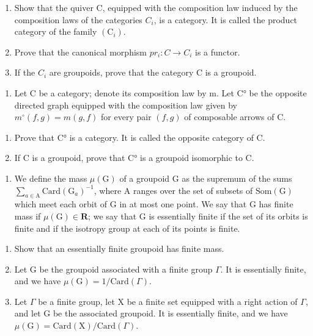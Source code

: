 \begin{enumerate}
\def\labelenumi{\alph{enumi})}
\item
  Show that the quiver C, equipped with the composition law induced by the composition laws of the categories \(C_{i}\), is a category. It is called the product category of the family \((\mathrm{C}_{i})\).
\item
  Prove that the canonical morphism \(pr_{i}: C \rightarrow C_{i}\) is a functor.
\item
  If the \(C_{i}\) are groupoids, prove that the category C is a groupoid.
\end{enumerate}

\begin{enumerate}
\def\labelenumi{\arabic{enumi})}
\setcounter{enumi}{2}
\tightlist
\item
  Let C be a category; denote its composition law by m. Let C° be the opposite directed graph equipped with the composition law given by \(m^{\circ}(f,g)=m(g,f)\) for every pair \((f,g)\) of composable arrows of C.
\end{enumerate}

\begin{enumerate}
\def\labelenumi{\alph{enumi})}
\item
  Prove that C° is a category. It is called the opposite category of C.
\item
  If C is a groupoid, prove that C° is a groupoid isomorphic to C.
\end{enumerate}

\begin{enumerate}
\def\labelenumi{\arabic{enumi})}
\setcounter{enumi}{3}
\tightlist
\item
  We define the mass \(\mu(\mathrm{G})\) of a groupoid G as the supremum of the sums \(\sum_{a\in\mathrm{A}}\mathrm{Card}(\mathrm{G}_{a})^{-1}\), where A ranges over the set of subsets of \(\mathrm{Som}(\mathrm{G})\) which meet each orbit of G in at most one point. We say that G has finite mass if \(\mu(\mathrm{G})\in\mathbf{R}\); we say that G is essentially finite if the set of its orbits is finite and if the isotropy group at each of its points is finite.
\end{enumerate}

\begin{enumerate}
\def\labelenumi{\alph{enumi})}
\item
  Show that an essentially finite groupoid has finite mass.
\item
  Let G be the groupoid associated with a finite group \(\Gamma\). It is essentially finite, and we have \(\mu(\mathrm{G}) = 1/\mathrm{Card}(\Gamma)\).
\item
  Let \(\Gamma\) be a finite group, let X be a finite set equipped with a right action of \(\Gamma\), and let G be the associated groupoid. It is essentially finite, and we have \(\mu(\mathrm{G}) = \mathrm{Card}(\mathrm{X}) / \mathrm{Card}(\Gamma)\).
\end{enumerate}

